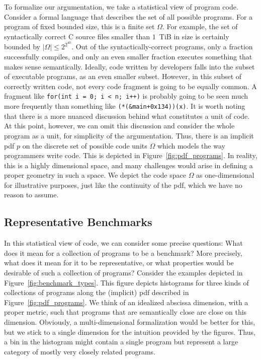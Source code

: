 To formalize our argumentation, we take a statistical view of program code.
Consider a formal language that describes the set of all possible programs.
For a program of fixed bounded size, this is a finite set $\Omega$.
For example, the set of syntactically correct C source files smaller than $1$~TiB in size is certainly bounded by $|\Omega| \leq 2^{2^{40}}$.
Out of the syntactically-correct programs, only a fraction successfully compiles, and only an even smaller fraction executes something that makes sense semantically.
Ideally, code written by developers falls into the subset of executable programs, as an even smaller subset.
However, in this subset of correctly written code, not every code fragment is going to be equally common.
A fragment like
\texttt{for(int i = 0; i < n; i++)} is probably going to be seen much more frequently than something like \texttt{(*(\&main+0x134))(x)}.
It is worth noting that there is a more nuanced discussion behind what constitutes a unit of code.
At this point, however, we can omit this discussion and consider the whole program as a unit, for simplicity of the argumentation.
Thus, there is an implicit \ac{pdf} $p$ on the discrete set of possible code units $\Omega$ which models the way programmers write code.
This is depicted in Figure~\ref{fig:pdf_programs}.
In reality, this is a highly dimensional space, and many challenges would arise in defining a proper geometry in such a space.
We depict the code space $\Omega$ as one-dimensional for illustrative purposes, just like the continuity of the \ac{pdf}, which we have no reason to assume.

\subsection{Representative Benchmarks}
\label{sec:representative_benchmarks}

In this statistical view of code, we can consider some precise questions: What does it mean for a collection of programs to be a benchmark?
More precisely, what does it mean for it to be representative, or what properties would be desirable of such a collection of programs?
Consider the examples depicted in Figure~\ref{fig:benchmark_types}.
This figure depicts histograms for three kinds of collections of programs along the (implicit) \ac{pdf} described in Figure~\ref{fig:pdf_programs}.
We think of an idealized abscissa dimension, with a proper metric, such that programs that are semantically close are close on this dimension.
Obviously, a multi-dimensional formalization would be better for this, but we stick to a single dimension for the intuition provided by the figures.
Thus, a bin in the histogram might contain a single program but represent a large category of mostly very closely related programs.

